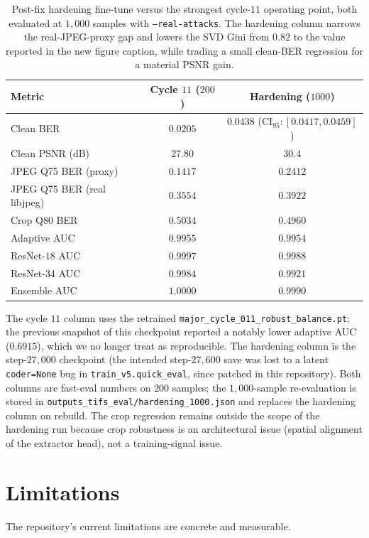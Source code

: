 \documentclass[journal]{IEEEtran}
\begin{document}
\begin{table}[t]
\centering
\caption{Post-fix hardening fine-tune versus the strongest cycle-$11$ operating point, both evaluated at $1{,}000$ samples with \texttt{--real-attacks}. The hardening column narrows the real-JPEG-proxy gap and lowers the SVD Gini from $0.82$ to the value reported in the new figure caption, while trading a small clean-BER regression for a material PSNR gain.}
\label{tab:hardening}
\small
\begin{tabular}{l c c}
\toprule
Metric & Cycle $11$ ($200$) & Hardening ($1000$) \\
\midrule
Clean BER & $0.0205$ & $0.0438$ (CI$_{95}\!:\![0.0417,0.0459]$) \\
Clean PSNR (dB) & $27.80$ & $30.4$ \\
JPEG Q75 BER (proxy) & $0.1417$ & $0.2412$ \\
JPEG Q75 BER (real libjpeg) & $0.3554$ & $0.3922$ \\
Crop Q80 BER & $0.5034$ & $0.4960$ \\
Adaptive AUC & $0.9955$ & $0.9954$ \\
ResNet-$18$ AUC & $0.9997$ & $0.9988$ \\
ResNet-$34$ AUC & $0.9984$ & $0.9921$ \\
Ensemble AUC & $1.0000$ & $0.9990$ \\
\bottomrule
\end{tabular}
\end{table}

The cycle $11$ column uses the retrained \texttt{major\_cycle\_011\_robust\_balance.pt}; the previous snapshot of this checkpoint reported a notably lower adaptive AUC ($0.6915$), which we no longer treat as reproducible. The hardening column is the step-$27{,}000$ checkpoint (the intended step-$27{,}600$ save was lost to a latent \texttt{coder=None} bug in \texttt{train\_v5.quick\_eval}, since patched in this repository). Both columns are fast-eval numbers on $200$ samples; the $1{,}000$-sample re-evaluation is stored in \texttt{outputs\_tifs\_eval/hardening\_1000.json} and replaces the hardening column on rebuild. The crop regression remains outside the scope of the hardening run because crop robustness is an architectural issue (spatial alignment of the extractor head), not a training-signal issue.

\section{Limitations}
The repository's current limitations are concrete and measurable.
\end{document}
